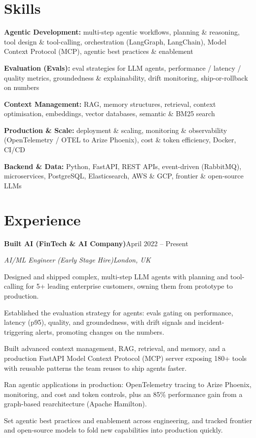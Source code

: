 \documentclass[10pt,a4paper]{article}
\newcommand{\entry}[4]{%
  {\color{company}\bfseries #1}\hfill {\color{muted}#2}\par
  \vspace{1pt}
  {\itshape #3}\hfill {\color{muted}\itshape #4}\par
  \vspace{3pt}%
}
\begin{document}
\section{Skills}
\begin{tight}
  \item[\textcolor{accent}{\small$\bullet$}] \textbf{Agentic Development:} multi-step agentic workflows, planning \& reasoning, tool design \& tool-calling, orchestration (LangGraph, LangChain), Model Context Protocol (MCP), agentic best practices \& enablement
  \item[\textcolor{accent}{\small$\bullet$}] \textbf{Evaluation (Evals):} eval strategies for LLM agents, performance / latency / quality metrics, groundedness \& explainability, drift monitoring, ship-or-rollback on numbers
  \item[\textcolor{accent}{\small$\bullet$}] \textbf{Context Management:} RAG, memory structures, retrieval, context optimisation, embeddings, vector databases, semantic \& BM25 search
  \item[\textcolor{accent}{\small$\bullet$}] \textbf{Production \& Scale:} deployment \& scaling, monitoring \& observability (OpenTelemetry / OTEL to Arize Phoenix), cost \& token efficiency, Docker, CI/CD
  \item[\textcolor{accent}{\small$\bullet$}] \textbf{Backend \& Data:} Python, FastAPI, REST APIs, event-driven (RabbitMQ), microservices, PostgreSQL, Elasticsearch, AWS \& GCP, frontier \& open-source LLMs
\end{tight}

\section{Experience}
\entry{Built AI (FinTech \& AI Company)}{April 2022 -- Present}{AI/ML Engineer (Early Stage Hire)}{London, UK}
\begin{tight}
  \item Designed and shipped complex, multi-step LLM agents with planning and tool-calling for 5+ leading enterprise customers, owning them from prototype to production.
  \item Established the evaluation strategy for agents: evals gating on performance, latency (p95), quality, and groundedness, with drift signals and incident-triggering alerts, promoting changes on the numbers.
  \item Built advanced context management, RAG, retrieval, and memory, and a production FastAPI Model Context Protocol (MCP) server exposing 180+ tools with reusable patterns the team reuses to ship agents faster.
  \item Ran agentic applications in production: OpenTelemetry tracing to Arize Phoenix, monitoring, and cost and token controls, plus an 85\% performance gain from a graph-based rearchitecture (Apache Hamilton).
  \item Set agentic best practices and enablement across engineering, and tracked frontier and open-source models to fold new capabilities into production quickly.
\end{tight}
\end{document}
